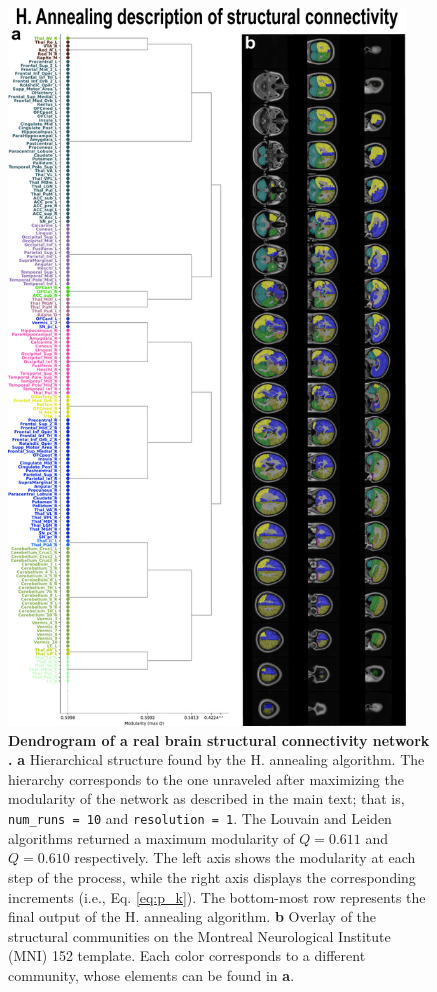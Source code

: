 \documentclass[pdflatex,sn-mathphys-num]{sn-jnl}%
\begin{document}
\begin{figure}[h!]
    \centering
    \includegraphics[width=.7\linewidth, height=19cm]{Figures/Fig6.pdf}
    \caption{\textbf{Dendrogram of a real brain structural connectivity network \cite{falco2024functional}.} \textbf{a} Hierarchical structure found by the H. annealing algorithm. The hierarchy corresponds to the one unraveled after maximizing the modularity of the network as described in the main text; that is, {\tt num\_runs = 10} and {\tt resolution = 1}. The Louvain and Leiden algorithms returned a maximum modularity of $Q=0.611$ and $Q=0.610$ respectively. The left axis shows the modularity at each step of the process, while the right axis displays the corresponding increments (i.e., Eq. \ref{eq:p_k}). The bottom-most row represents the final output of the H. annealing algorithm. \textbf{b} Overlay of the structural communities on the Montreal Neurological Institute (MNI) 152 template. Each color corresponds to a different community, whose elements can be found in \textbf{a}.}
    \label{fig:dendro_aal}
\end{figure}
\end{document}
